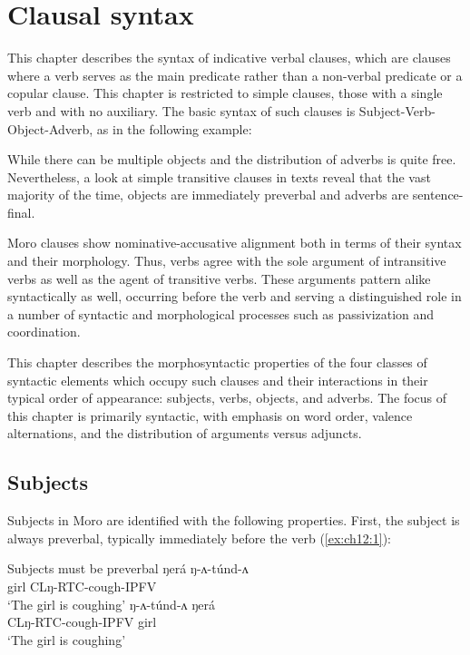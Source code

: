 \chapter{Clausal syntax}\label{chapter:syntax}

This chapter describes the syntax of indicative verbal clauses, which are clauses where a verb serves as the main predicate rather than a non-verbal predicate or a copular clause. This chapter is restricted to simple clauses, those with a single verb and with no auxiliary. The basic syntax of such clauses is Subject-Verb-Object-Adverb, as in the following example:

While there can be multiple objects and the distribution of adverbs is quite free. Nevertheless, a look at simple transitive clauses in texts reveal that the vast majority of the time, objects are immediately preverbal and adverbs are sentence-final. %

Moro clauses show nominative-accusative alignment both in terms of their syntax and their morphology. Thus, verbs agree with the sole argument of intransitive verbs as well as the agent of transitive verbs. These arguments pattern alike syntactically as well, occurring before the verb and serving a distinguished role in a number of syntactic and morphological processes such as passivization and coordination.

This chapter describes the morphosyntactic properties of the four classes of syntactic elements which occupy such clauses and their interactions in their typical order of appearance: subjects, verbs, objects, and adverbs. The focus of this chapter is primarily syntactic, with emphasis on word order, valence alternations, and the distribution of arguments versus adjuncts.

\section{Subjects}\label{sec:ch12:subjects}

Subjects in Moro are identified with the following properties. First, the subject is always preverbal, typically immediately before the verb (\ref{ex:ch12:1}):  %

\ea Subjects must be preverbal \label{ex:ch12:1}
\ea ŋerá ŋ-ʌ-túnd-ʌ\\
girl CLŋ-RTC-cough-IPFV\\
`The girl is coughing'
\ex *ŋ-ʌ-túnd-ʌ ŋerá\\
CLŋ-RTC-cough-IPFV girl\\
`The girl is coughing'
\z 
\z 

